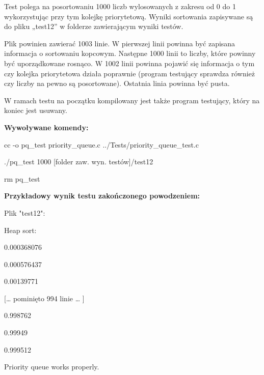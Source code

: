 \documentclass[11pt,a4paper]{report}
\newenvironment{multiconsole}{\begingroup\fontfamily{qcr}\selectfont}{\endgroup}
\begin{document}
    Test polega na posortowaniu 1000 liczb wylosowanych z zakresu od 0 do 1 wykorzystując przy tym kolejkę priorytetową. Wyniki sortowania zapisywane są do pliku „test12” w folderze zawierającym wyniki testów.
    
    Plik powinien zawierać 1003 linie. W pierwszej linii powinna być zapisana informacja o sortowaniu kopcowym. Następne 1000 linii to liczby, które powinny być uporządkowane rosnąco. W 1002 linii powinna pojawić się informacja o tym czy kolejka priorytetowa działa poprawnie (program testujący sprawdza również czy liczby na pewno są posortowane). Ostatnia linia powinna być pusta.

    W ramach testu na początku kompilowany jest także program testujący, który na koniec jest usuwany.

    \vspace{2em}

    \textbf{Wywoływane komendy:}

    \vspace{1em}

    \begin{multiconsole}
        cc -o pq\_test priority\_queue.c ../Tests/priority\_queue\_test.c

        ./pq\_test 1000 [folder zaw. wyn. testów]/test12

        rm pq\_test
    \end{multiconsole}

    \vspace{2em}

    \textbf{Przykładowy wynik testu zakończonego powodzeniem:}

    Plik "test12":

    \begin{multiconsole}
        Heap sort:

        0.000368076

        0.000576437

        0.00139771

        [… pominięto 994 linie … ]

        0.998762

        0.99949

        0.999512

        Priority queue works properly.
    \end{multiconsole}
\end{document}
